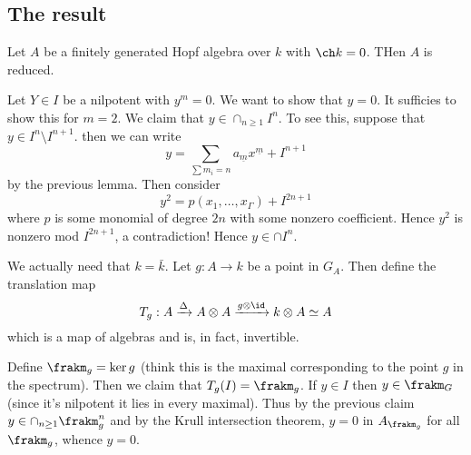 \documentclass[12pt]{article}
\begin{document}
\subsection{The result}
\begin{thm}
	Let $A$ be a finitely generated Hopf algebra over $k$ with $\ch k=0$. THen $A$ is reduced.
\end{thm}
\begin{prf}
	Let $Y\in I$ be a nilpotent with $y^m=0$. We want to show that $y=0$. It sufficies to show this for $m=2$.
	We claim that $y\in \cap_{n\ge 1}I^n$. To see this, suppose that $y\in I^n\setminus I^{n+1}$.
	then we can write 
	\[y=\sum_{\sum m_i=n}a_{\underline m}x^{\underline m}+I^{n+1}\]
	by the previous lemma. Then consider 
	\[y^2=p(x_1,\dots,x_\Gamma)+I^{2n+1}\]
	where $p$ is some monomial of degree $2n$ with some nonzero coefficient. Hence $y^2$ is nonzero mod $I^{2n+1}$, a contradiction!
	Hence $y\in\cap I^n$.

	We actually need that $k=\bar k$. Let $g:A\to k$ be a point in $G_A$. Then define the translation map
	\[T_g:A\xrightarrow{\Delta}A\otimes A\xrightarrow{g\otimes \id}k\otimes A\simeq A\]
	which is a map of algebras and is, in fact, invertible.

	Define $\frakm_g=\ker g$ (think this is the maximal corresponding to the point $g$ in the spectrum). Then we claim that $T_g(I)=\frakm_g$.
	If $y\in I$ then $y\in \frakm_G$ (since it's nilpotent it lies in every maximal). Thus 
	by the previous claim $y\in\cap_{n\ge 1} \frakm_g^n$ and by the Krull intersection theorem, $y=0$ in $A_{\frakm_g}$ for all $\frakm_g$,
	whence $y=0.$
\end{prf}
\end{document}
